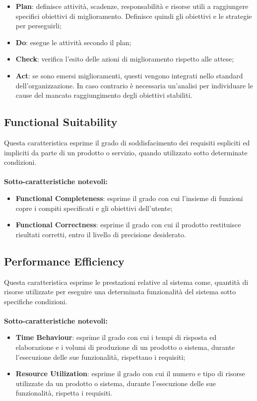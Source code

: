\begin{itemize}
	\item \textbf{Plan}: definisce attività, scadenze, responsabilità e risorse utili a raggiungere specifici obiettivi di miglioramento. Definisce quindi gli obiettivi e le strategie per perseguirli;
	
	\item \textbf{Do}: esegue le attività secondo il plan;
	
	\item \textbf{Check}: verifica l'esito delle azioni di miglioramento rispetto alle attese;
	
	\item \textbf{Act}: se sono emersi miglioramenti, questi vengono integrati nello standard dell'organizzazione.
	In caso contrario è necessaria un'analisi per individuare le cause del mancato raggiungimento degli obiettivi stabiliti.
\end{itemize}
\newpage
{}
\subsection{Functional Suitability}
Questa caratteristica esprime il grado di soddisfacimento dei requisiti espliciti ed impliciti da parte di un prodotto o servizio, quando utilizzato sotto determinate condizioni.\\ \\
\textbf{Sotto-caratteristiche notevoli:}
\begin{itemize}
	\item{\textbf{Functional Completeness}}: esprime il grado con cui l'insieme di funzioni copre i compiti specificati e gli obiettivi dell'utente;
	\item{\textbf{Functional Correctness}}: esprime il grado con cui il prodotto restituisce risultati corretti, entro il livello di precisione desiderato.
\end{itemize}

\subsection{Performance Efficiency}
Questa caratteristica esprime le prestazioni relative al sistema come, quantità di risorse utilizzate per eseguire una determinata funzionalità del sistema sotto specifiche condizioni.  \\ \\
\textbf{Sotto-caratteristiche notevoli:}
\begin{itemize}
	\item{\textbf{Time Behaviour}}: esprime il grado con cui i tempi di risposta ed elaborazione e i volumi di produzione di un prodotto o sistema, durante l'esecuzione delle sue funzionalità, rispettano i requisiti;
	\item{\textbf{Resource Utilization}}: esprime il grado con cui il numero e tipo di risorse utilizzate da un prodotto o sistema, durante l'esecuzione delle sue funzionalità, rispetta i requisiti.
\end{itemize}

